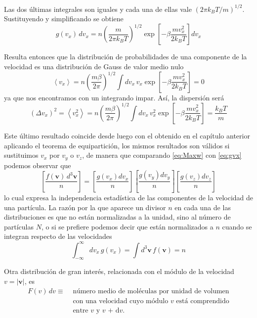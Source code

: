 Las dos últimas integrales son iguales y cada una de ellas vale $(2\pi k_B T/m)^{1/2}$.
Sustituyendo y simplificando se obtiene
\begin{equation}\label{eq:gvx}
	g(v_x) \, dv_x = n \left( \frac{m}{2\pi k_B T} \right) ^{1/2} \exp \left[ -\beta\frac{mv_x^2}{2 k_B T} \right] dv_x
\end{equation}

Resulta entonces que la distribución de probabilidades de una componente de la velocidad es una distribución de Gauss de valor medio nulo
\begin{equation}
	\left\langle v_x \right\rangle = n \left( \frac{m\beta}{2\pi} \right) ^{1/2} \int dv_x \, v_x \exp \left[ -\beta\frac{mv_x^2}{2 k_B T} \right] = 0
\end{equation}
ya que nos encontramos con un integrando impar.
Así, la dispersión será
\begin{equation}
	(\Delta v_x)^2 = \left\langle v_x^2 \right\rangle = n \left( \frac{m\beta}{2\pi} \right) ^{1/2} \int dv_x \, v_x^2 \exp \left[ -\beta\frac{mv_x^2}{2 k_B T} \right] = \frac{k_B T}{m}
\end{equation}

Este último resultado coincide desde luego con el obtenido en el capítulo anterior aplicando el teorema de equipartición, los mismos resultados son válidos si sustituimos $v_x$ por $v_y$ o $v_z$, de manera que comparando \eqref{eq:Maxw} con \eqref{eq:gvx} podemos observar que
\begin{equation}
	\left[ \frac{f(\mathbf{v}) \, d^3 \mathbf{v}}{n} \right]  = \left[ \frac{g(v_x)dv_x}{n} \right] \left[ \frac{g(v_y)dv_y}{n} \right] \left[ \frac{g(v_z)dv_z}{n} \right] 
\end{equation}
lo cual expresa la independencia estadística de las componentes de la velocidad de una partícula.
La razón por la que aparece un divisor $n$ en cada una de las distribuciones es que no están normalizadas a la unidad, sino al número de partículas $N$, o si se prefiere podemos decir que están normalizados a $n$ cuando se integran respecto de las velocidades
\begin{equation}
	\int_{-\infty}^{\infty} dv_x \, g(v_x) = \int d^3 \mathbf{v} \, f(\mathbf{v}) = n
\end{equation}

Otra distribución de gran interés, relacionada con el módulo de la velocidad $v = |\mathbf{v}|$, es
\begin{align}
	F(v) \, dv \equiv & \text{ número medio de moléculas por unidad de volumen} \nonumber \\
		& \text{ con una velocidad cuyo módulo $v$ está comprendido}  \\
		& \text{ entre $v$ y $v$ + d$v$}. \nonumber
\end{align}

